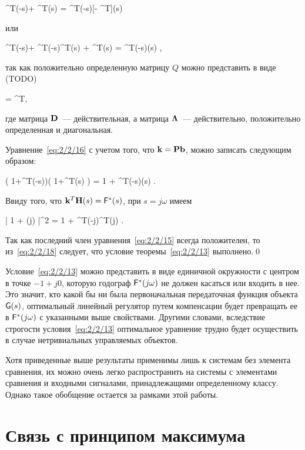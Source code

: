 \beqn
    \mH^T(-s)\mP \mb + \mb^T\mP\mH(s) = \mH^T(-s)[\mQ - \mP\mb\mb^T\mP]\mH(s)
\eeqn

или

    \mH^T(-s)\mP\mb + \mH^T(-s)\mP\mb\mb^T\mP\mH(s) + \mb^T\mP\mH(s) = \mH^T(-s)\mQ\mH(s) \mbox{,}
\eeq

так как положительно определенную матрицу $Q$ можно представить в виде (TODO)

\beqn
    \mQ = \mD^T\mLa\mD \mbox{,}
\eeqn

где матрица $\mathbf{D}$~--- действительная, а матрица $\mathbf{\Lambda}$~--- действительно, положительно определенная и диагональная.

Уравнение~\ref{eq:2/2/16} с учетом того, что $\mathbf{k} = \mathbf{P}\mathbf{b}$, можно записать следующим образом:

    \bigl( 1+\mH^T(-s)\mk \bigr)\bigl( 1+\mk^T\mH(s) \bigr) = 1 + \mH^T(-s)\mD\mLa\mD\mH(s) \mbox{.}
\eeq

Ввиду того, что $\mathbf{k}^T\mathbf{H}(s) = \mathsf{F}^{*}(s)$, при $s = j\omega$ имеем

    \bigl| 1 + \funcT(j\omega) \bigr|^2 = 1 + \mH^T(-j\omega)\mD^T\mLa\mD\mH(j\omega) \mbox{.}
\eeq

Так как последний член уравнения~\vref{eq:2/2/15} всегда положителен, то из~\ref{eq:2/2/18} следует, что условие теоремы~\ref{eq:2/2/13} выполнено.\qed

Условие~\ref{eq:2/2/13} можно представить в виде единичной окружности с центром в точке $-1 + j0$, которую годограф $\mathsf{F}^{*}(j\omega)$ не должен касаться или входить в нее. Это значит, кто какой бы ни была первоначальная передаточная функция объекта $\mathsf{G}(s)$, оптимальный линейный регулятор путем компенсации будет превращать ее в $\mathsf{F}^{*}(j\omega)$ с указанными выше свойствами. Другими словами, вследствие строгости условия~\vref{eq:2/2/13} оптимальное уравнение трудно будет осуществить в случае нетривиальных управляемых объектов.

\br

Хотя приведенные выше результаты применимы лишь к системам без элемента сравнения, их можно очень легко распространить на системы с элементами сравнения и входными сигналами, принадлежащими определенному классу. Однако такое обобщение остается за рамками этой работы.



\section{Связь с принципом максимума}




